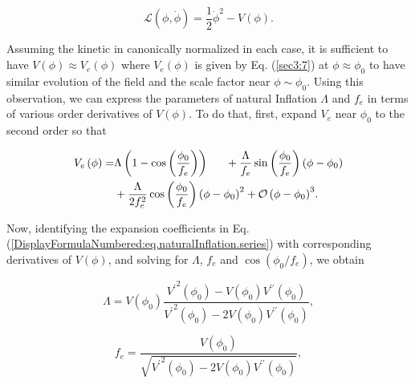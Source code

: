 \documentclass[12pt]{article}
\begin{document}
\begin{equation}
  \mathcal{L}\left(\phi,\dot{\phi}\right)=\frac{1}{2}{\dot{\phi}}^2-V\left(\phi \right).
\end{equation}

Assuming  the kinetic in canonically normalized in each case, it is sufficient to have $V\left(\phi \right)\approx V_{e}\left(\phi \right)$
where $V_{e}\left(\phi \right)$ is given by Eq. (\ref{sec3:7})
at $\phi \approx \phi_0$ to have similar evolution of the field and the scale factor near $\phi\sim \phi_0$. Using this observation, we can  express the parameters of natural Inflation $\Lambda$ and $f_e$ in terms of various order derivatives of $V\left(\phi \right)$. To do that, first, expand $V_{e}$ near $\phi_0$ to the second order so that

\begin{equation}\label{DisplayFormulaNumbered:eq.naturalInflation.series}
  \begin{split}
    V_{e}\left(\phi \right)=&\Lambda \left(1-\cos\left(\frac{\phi_0}{f_e}\right)\right)
    \indent{}+\frac{\Lambda}{f_e}\sin\left(\frac{\phi_0}{f_e}\right)\left(\phi -\phi_0\right)\\
    &+\frac{\Lambda}{2f_e^2}\cos\left(\frac{\phi_0}{f_e}\right){\left(\phi -\phi_0\right)}^2+{\mathcal{O}\left(\phi -\phi_0\right)}^3.
  \end{split}
\end{equation}

Now, identifying the expansion coefficients in Eq.(\ref{DisplayFormulaNumbered:eq.naturalInflation.series}) with corresponding derivatives of $V\left(\phi \right)$, and solving for $\Lambda$, $f_e$ and $\cos\left(\phi_0/f_e\right)$, we obtain

\begin{equation}\label{DisplayFormulaNumbered:eq.lambda.potential}
  \Lambda =V\left(\phi_0\right)\frac{{V^\prime}^2\left(\phi_0\right)-V\left(\phi_0\right)V^{\prime\prime} \left(\phi_0\right)}{{V^\prime}^2\left(\phi_0\right)-2V\left(\phi_0\right)V^{\prime\prime} \left(\phi_0\right)},
\end{equation}

\begin{equation}\label{DisplayFormulaNumbered:eq.fe.potential}
  f_e=\frac{V\left(\phi_0\right)}{\sqrt{{V^\prime}^2\left(\phi_0\right)-2V\left(\phi_0\right)V^{\prime\prime} \left(\phi_0\right)}},
\end{equation}
\end{document}
